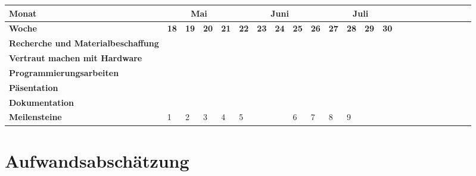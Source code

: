 \documentclass[lang=ngerman,inputenc=utf8,fontsize=10pt]{ldvarticle}
\begin{document}
\begin{itemize}
\begin{center}
\begin{footnotesize}
\setlength{\arrayrulewidth}{1,05pt}
\begin{tabular}[htb]{|m{}|p{.05cm}|p{.05cm}|p{.05cm}|p{.05cm}|p{.05cm}|p{.05cm}|p{.05cm}|p{.05cm}|p{.05cm}|p{.05cm}|p{.05cm}|p{.05cm}|p{.05cm}|p{.05cm}|p{.05cm}|p{.05cm}|p{.05cm}|p{.05cm}|p{.05cm}|p{.05cm}|p{.05cm}|p{.05cm}|}
	\hline
	\textbf{Monat}& \multicolumn{4}{|c|}{Mai} & \multicolumn{5}{|c|}{Juni} & \multicolumn{4}{|c|}{Juli} \\ 
	\hline
	\textbf{Woche}&\tiny\textbf{18}&\tiny\textbf{19}&\tiny\textbf{20}&\tiny\textbf{21}& \tiny \textbf{22} & \tiny \textbf{23} & \tiny \textbf{24} & \tiny \textbf{25} &  \tiny \textbf{26} &  \tiny \textbf{27} &  \tiny \textbf{28} &  \tiny \textbf{29}  &  \tiny \textbf{30}\\
	\hline
	\hline
	\rowcolor{lightgray} \textbf{Recherche und Materialbeschaffung}& \cellcolor{red} &\cellcolor{red} & & & & & & & & & & & \\
	\hline
	\rowcolor{lightgray} \textbf{Vertraut machen mit Hardware}& &\cellcolor{red} &\cellcolor{red} &\cellcolor{red} & & & & & & & & & \\
	\hline
	\rowcolor{lightgray} \textbf{Programmierungsarbeiten}& & &\cellcolor{red} &\cellcolor{red} &\cellcolor{red} &\cellcolor{red} &\cellcolor{red} &\cellcolor{red} &\cellcolor{red} &\cellcolor{red} & & & \\
	\hline
	\rowcolor{lightgray} \textbf{Päsentation}&\cellcolor{red} & & & &\cellcolor{red} & & & & & & & &\\
	\hline
	\rowcolor{lightgray} \textbf{Dokumentation}&\cellcolor{red} &\cellcolor{red} &\cellcolor{red} &\cellcolor{red} &\cellcolor{red} &\cellcolor{red} &  \cellcolor{red} & \cellcolor{red} & \cellcolor{red} &\cellcolor{red} &\cellcolor{red} &\cellcolor{red} &\cellcolor{red}\\
	\hline
	\rowcolor{lightgray} \textbf{Meilensteine}&1 &2 &3 &4 &5 & & &6 &7 &8&9 & & \\
	\hline
		
\end{tabular}
\end{footnotesize}
\end{center}


\section{Aufwandsabschätzung}


\end{itemize}
\end{document}
